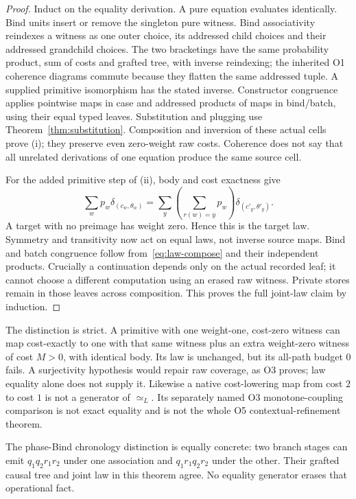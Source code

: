 \documentclass[11pt,a4paper]{article}
\theoremstyle{definition}
\begin{document}
\begin{proof}
Induct on the equality derivation. A pure equation evaluates identically.
Bind units insert or remove the singleton pure witness. Bind associativity
reindexes a witness as one outer choice, its addressed child choices and
their addressed grandchild choices. The two bracketings have the same
probability product, sum of costs and grafted tree, with inverse reindexing;
the inherited O1 coherence diagrams commute because they flatten the same
addressed tuple. A supplied primitive isomorphism has the stated inverse.
Constructor congruence applies pointwise maps in case and addressed products
of maps in bind/batch, using their equal typed leaves. Substitution and
plugging use Theorem~\ref{thm:substitution}. Composition and inversion of
these actual cells prove (i); they preserve even zero-weight raw costs.
Coherence does not say that all unrelated derivations of one equation
produce the same source cell.

For the added primitive step of (ii), body and cost exactness give
\[
 \sum_wp_w\delta_{(c_w,\theta_w)}
 =\sum_y\left(\sum_{r(w)=y}p_w\right)
                        \delta_{(c'_y,\theta'_y)}.
\]
A target with no preimage has weight zero. Hence this is the target law.
Symmetry and transitivity now act on equal laws, not inverse source maps.
Bind and batch congruence follow from~\eqref{eq:law-compose} and their
independent products. Crucially a continuation depends only on the actual
recorded leaf; it cannot choose a different computation using an erased raw
witness. Private stores remain in those leaves across composition. This
proves the full joint-law claim by induction.
\end{proof}

The distinction is strict. A primitive with one weight-one, cost-zero
witness can map cost-exactly to one with that same witness plus an extra
weight-zero witness of cost $M>0$, with identical body. Its law is unchanged,
but its all-path budget $0$ fails. A surjectivity hypothesis would repair
raw coverage, as O3 proves; law equality alone does not supply it. Likewise
a native cost-lowering map from cost $2$ to cost $1$ is not a generator of
$\simeq_L$. Its separately named O3 monotone-coupling comparison is not
exact equality and is not the whole O5 contextual-refinement theorem.

The phase-Bind chronology distinction is equally concrete: two branch
stages can emit $q_1q_2r_1r_2$ under one association and
$q_1r_1q_2r_2$ under the other. Their grafted causal tree and joint law in
this theorem agree. No equality generator erases that operational fact.
\end{document}
